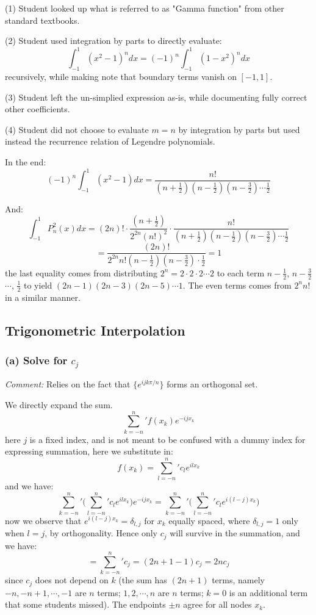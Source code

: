\documentclass[12pt]{article} %
\newcommand{\1}[1]{\mathds{1}\left[#1\right]}
\begin{document}
(1) Student looked up what is referred to as "Gamma function" from other standard textbooks.

(2) Student used integration by parts to directly evaluate:
$$
	\int_{-1}^1(x^2-1)^ndx = (-1)^n\int_{-1}^1(1-x^2)^ndx
$$ recursively, while making note that boundary terms vanish on $[-1,1]$.

(3) Student left the un-simplied expression as-is, while documenting fully correct other coefficients.

(4) Student did not choose to evaluate $m=n$ by integration by parts but used instead the recurrence relation of Legendre polynomials.

In the end:
$$
	(-1)^n\int_{-1}^1(x^2-1)dx=\frac{n!}{(n+\frac12)(n-\frac12)(n-\frac{3}{2})\cdots \frac12}
$$

And:
$$
	\int_{-1}^1P_n^2(x)dx = (2n)!\cdot\frac{(n+\frac12)}{2^{2n}(n!)^2}\cdot \frac{n!}{(n+\frac12)(n-\frac12)(n-\frac{3}{2})\cdots \frac12}
$$
$$
	= \frac{(2n)!}{2^{2n}n!(n-\frac12)(n-\frac32)\cdot\frac12} =1
$$ the last equality comes from distributing $2^n = 2\cdot 2\cdot 2\cdots 2$ to each term $n-\frac12$, $n-\frac32$ $\cdots$, $\frac12$ to yield $(2n-1)(2n-3)(2n-5)\cdots 1$. The even terms comes from $2^nn!$ in a similar manner.



\newpage
\subsection{Trigonometric Interpolation}
\subsubsection{(a) Solve for $c_j$}
\emph{Comment: }Relies on the fact that $\{e^{ijk\pi/n}\}$ forms an orthogonal set. 

We directly expand the sum.
$$
	\sum_{k=-n}^n{'}f(x_k)e^{-ijx_k}
$$ here $j$ is a fixed index, and is not meant to be confused with a dummy index for expressing summation, here we substitute in:
$$
	f(x_k) = \sum_{l=-n}^{n}{'}c_le^{ilx_k}
$$ and we have:
$$
	\sum_{k=-n}^{n}{'}\bigg(\sum_{l=-n}^n{'}c_le^{ilx_k}\bigg)e^{-ijx_k} = \sum_{k=-n}^{n}{'}\bigg(\sum_{l=-n}^n{'}c_le^{i(l-j)x_k}\bigg)
$$ now we observe that $e^{i(l-j)x_k} = \delta_{l,j}$ for $x_k$ equally spaced, where $\delta_{l,j} = 1$ only when $l=j$, by orthogonality. Hence only $c_j$ will survive in the summation, and we have:
$$
	= \sum_{k=-n}^n{'}c_j = (2n+1-1)c_j = 2nc_j
$$ since $c_j$ does not depend on $k$ (the sum has $(2n+1)$ terms, namely $-n, -n+1, \cdots, -1$ are $n$ terms; $1, 2, \cdots, n$ are $n$ terms; $k=0$ is an additional term that some students missed). The endpoints $\pm n$ agree for all nodes $x_k$.
\end{document}
